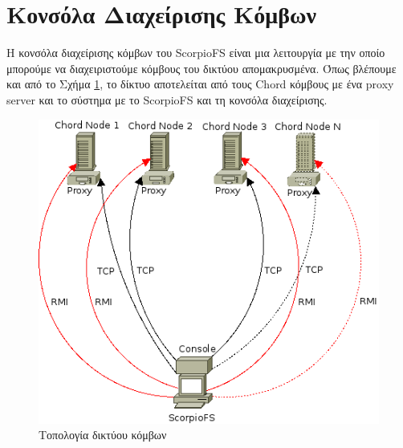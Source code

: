 \documentclass[a4paper]{article}
\begin{document}
\section{Κονσόλα Διαχείρισης Κόμβων}
Η κονσόλα διαχείρισης κόμβων του ScorpioFS είναι μια λειτουργία με την οποίο
μπορούμε να διαχειριστούμε κόμβους του δικτύου απομακρυσμένα. Όπως βλέπουμε και
από το Σχήμα \ref{fig:topology}, το δίκτυο αποτελείται από τους Chord κόμβους με ένα
proxy server και το σύστημα με το ScorpioFS και τη κονσόλα διαχείρισης.\\

\begin{figure}[tbh]
\centering
\includegraphics[scale=0.75]{images/scorpio_console.png}
\caption{Τοπολογία δικτύου κόμβων}
\label{fig:topology}
\end{figure}
\end{document}
